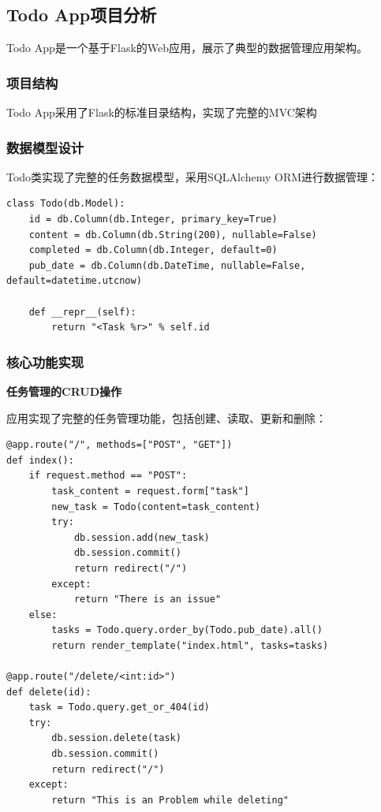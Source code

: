 \documentclass[a4paper]{article}
\begin{document}
\subsection{Todo App项目分析}

Todo App是一个基于Flask的Web应用，展示了典型的数据管理应用架构。

\subsubsection{项目结构}

Todo App采用了Flask的标准目录结构，实现了完整的MVC架构

\subsubsection{数据模型设计}

Todo类实现了完整的任务数据模型，采用SQLAlchemy ORM进行数据管理：

\begin{lstlisting}[style=pythoncode, caption=Todo数据模型]
class Todo(db.Model):
    id = db.Column(db.Integer, primary_key=True)
    content = db.Column(db.String(200), nullable=False)
    completed = db.Column(db.Integer, default=0)
    pub_date = db.Column(db.DateTime, nullable=False, default=datetime.utcnow)

    def __repr__(self):
        return "<Task %r>" % self.id
\end{lstlisting}

\subsubsection{核心功能实现}

\textbf{任务管理的CRUD操作}

应用实现了完整的任务管理功能，包括创建、读取、更新和删除：

\begin{lstlisting}[style=pythoncode, caption=任务管理核心逻辑]
@app.route("/", methods=["POST", "GET"])
def index():
    if request.method == "POST":
        task_content = request.form["task"]
        new_task = Todo(content=task_content)
        try:
            db.session.add(new_task)
            db.session.commit()
            return redirect("/")
        except:
            return "There is an issue"
    else:
        tasks = Todo.query.order_by(Todo.pub_date).all()
        return render_template("index.html", tasks=tasks)

@app.route("/delete/<int:id>")
def delete(id):
    task = Todo.query.get_or_404(id)
    try:
        db.session.delete(task)
        db.session.commit()
        return redirect("/")
    except:
        return "This is an Problem while deleting"
\end{lstlisting}
\end{document}
